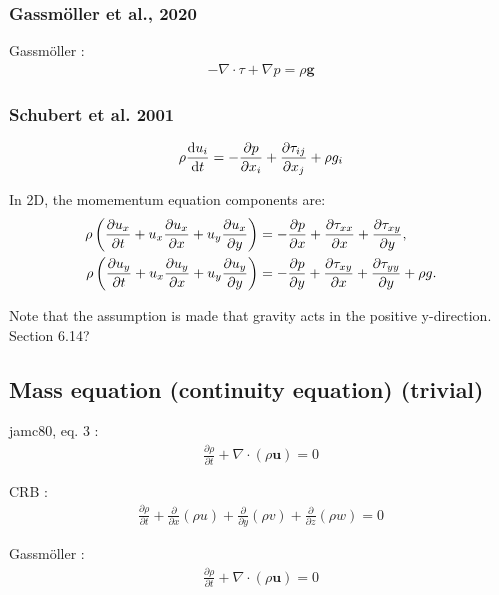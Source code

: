 \documentclass[document.tex]{subfiles}
\begin{document}
\subsubsection{Gassmöller et al., 2020}
Gassmöller \cite{gada20}: 
\begin{align}
-\nabla \cdot \tau + \nabla p = \rho \textbf{g}
\end{align}

\subsubsection{Schubert et al. 2001}
\begin{align} %
\rho	 \dv{u_i}{t} = -\pdv{p}{x_i} + \pdv{\tau	_{ij}}{x_j} + \rho g_i
\end{align}

In 2D, the momementum equation components are: 
\begin{align}
\rho \left(
    \pdv{u_x}{t}
    + u_x \pdv{u_x}{x}
    + u_y \pdv{u_x}{y}
\right)
&= -\pdv{p}{x}
   + \pdv{\tau_{xx}}{x}
   + \pdv{\tau_{xy}}{y},
\\
\rho \left(
    \pdv{u_y}{t}
    + u_x \pdv{u_y}{x}
    + u_y \pdv{u_y}{y}
\right)
&= -\pdv{p}{y}
   + \pdv{\tau_{xy}}{x}
   + \pdv{\tau_{yy}}{y}
   + \rho g.
\end{align}

Note that the assumption is made that gravity acts in the positive y-direction. Section 6.14?

\subsection{Mass equation (continuity equation) (trivial)}

jamc80, eq. 3 \cite{jamc80}: 
\begin{align}
\frac{\partial \rho}{\partial t} + \nabla \cdot(\rho \textbf{u})=0
\end{align}

CRB \cite{cube11}: 
\begin{align}
\frac{\partial \rho}{\partial t } + \frac{\partial}{\partial x}(\rho u) + \frac{\partial}{\partial y}(\rho v)+ \frac{\partial}{\partial z}(\rho w) = 0
\end{align}

Gassmöller \cite{gada20}: 
\begin{align}
\frac{\partial \rho}{\partial t} + \nabla \cdot(\rho \textbf{u})=0
\end{align}
\end{document}
